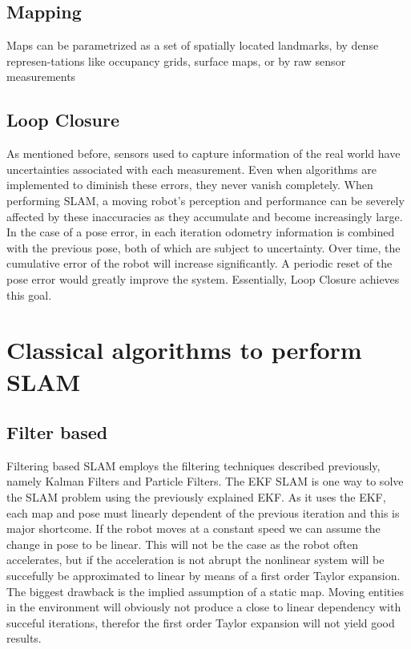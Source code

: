 \subsection{Mapping}


Maps  can  be  parametrized  as  a  set  of  spatially  located landmarks, by dense represen-tations  like  occupancy  grids,  surface  maps, or by raw sensor measurements

\subsection{Loop Closure}

As mentioned before, sensors used to capture information of the real world have uncertainties associated with each measurement. Even when algorithms are implemented to diminish these errors, they never vanish completely. When performing \acs*{SLAM}, a moving robot's perception and performance can be severely affected by these inaccuracies as they accumulate and become increasingly large. In the case of a pose error, in each iteration odometry information is combined with the previous pose, both of which are subject to uncertainty. Over time, the cumulative error of the robot will increase significantly. A periodic reset of the pose error would greatly improve the system. Essentially, Loop Closure achieves this goal.

\section{Classical algorithms to perform \acs*{SLAM}}

\subsection{Filter based}

Filtering based \acs*{SLAM} employs the filtering techniques described previously, namely Kalman Filters and Particle Filters. The \acs*{EKF} \acs*{SLAM} is one way to solve the \acs*{SLAM} problem using the previously explained \acl*{EKF}. As it uses the \acs*{EKF}, each map and pose must linearly dependent of the previous iteration and this is major shortcome. If the robot moves at a constant speed we can assume the change in pose to be linear. This will not be the case as the robot often accelerates, but if the acceleration is not abrupt the nonlinear system will be succefully be approximated to linear by means of a first order Taylor expansion. The biggest drawback is the implied assumption of a static map. Moving entities in the environment will obviously not produce a close to linear dependency with succeful iterations, therefor the first order Taylor expansion will not yield good results. 


